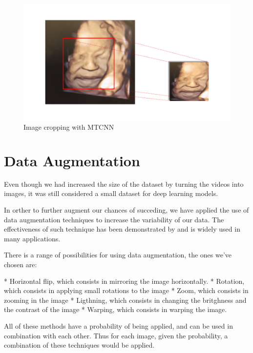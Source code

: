 \begin{figure}[h!tp]
    \centering
    \includegraphics[width=.9\textwidth]{imgs/chap3_cropping.png}
    \caption{Image cropping with MTCNN}
    \label{fig:cropping}
\end{figure}

\section{Data Augmentation}

Even though we had increased the size of the dataset by turning the videos into images, it was still considered a small dataset for deep learning models. 

In orther to further augment our chances of succeding, we have applied the use of data augmentation techniques to increase the variability of our data. The effectiveness of such technique has been demonstrated by \cite{abs-1712-04621} and is widely used in many applications.

There is a range of possibilities for using data augmentation, the ones we've chosen are:

* Horizontal flip, which consists in mirroring the image horizontally. 
* Rotation, which consists in applying small rotations to the image
* Zoom, which consists in zooming in the image
* Ligthning, which consists in changing the britghness and the contrast of the image
* Warping, which consists in warping the image. 

All of these methods have a probability of being applied, and can be used in combination with each other. Thus for each image, given the probability, a combination of these techniques would be applied. 

